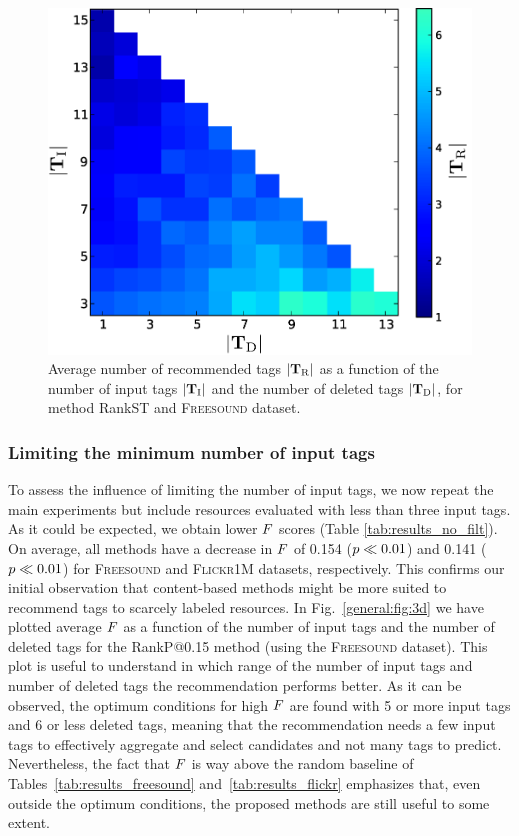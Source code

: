 \begin{figure}
  \centerline{
  \includegraphics[width=\figSizeMid]{ch03_general/pics/08_recommended_tags_statistical_test.pdf}} 
  \caption[Average number of recommended tags as a function of the number of input tags and the number of deleted tags]{Average number of recommended tags $|\mathbf{T}_{\text{R}}|$ as a function of  the number of input tags $|\mathbf{T}_{\text{I}}|$ and the number of deleted tags $|\mathbf{T}_{\text{D}}|$, for method RankST and \textsc{Freesound} dataset.}
  \label{general:fig:added}
\end{figure}

\subsubsection{Limiting the minimum number of input tags}

To assess the influence of limiting the number of input tags, we now repeat the main experiments but include resources evaluated with less than three input tags. 
As it could be expected, we obtain lower $F$ scores (Table \ref{tab:results_no_filt}).
On average, all methods have a decrease in $F$  of 0.154 ($p\ll0.01$) and 0.141 ($p\ll0.01$) for \textsc{Freesound} and \textsc{Flickr1M} datasets, respectively. This confirms our initial observation that content-based methods might be more suited to recommend tags to scarcely labeled resources. In Fig.~\ref{general:fig:3d} we have plotted average $F$ as a function of the number of input tags and the number of deleted tags for the RankP@0.15 method (using the \textsc{Freesound} dataset). This plot is useful to understand in which range of the number of input tags and number of deleted tags the recommendation performs better.  As it can be observed, the optimum conditions for high $F$ are found with 5 or more input tags and 6 or less deleted tags, meaning that the recommendation needs a few input tags to effectively aggregate and select candidates and not many tags to predict.
Nevertheless, the fact that $F$ is way above the random baseline of Tables~\ref{tab:results_freesound} and~\ref{tab:results_flickr} emphasizes that, even outside the optimum conditions, the proposed methods are still useful to some extent.


